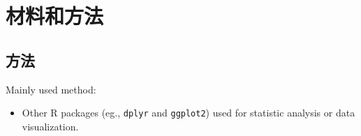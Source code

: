 \documentclass[
]{article}
\providecommand{\tightlist}{%
  \setlength{\itemsep}{0pt}\setlength{\parskip}{0pt}}
\begin{document}
\hypertarget{methods}{%
\section{材料和方法}\label{methods}}

\hypertarget{ux65b9ux6cd5}{%
\subsection{方法}\label{ux65b9ux6cd5}}

Mainly used method:

\begin{itemize}
\tightlist
\item
  Other R packages (eg., \texttt{dplyr} and \texttt{ggplot2}) used for statistic analysis or data visualization.
\end{itemize}
\end{document}
